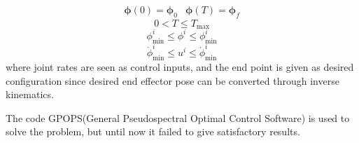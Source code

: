 \documentclass{article}
\begin{document}
	\begin{equation}
	\begin{array}{rl}
		\bm{\phi}(0) = \bm{\phi}_0 & \bm{\phi}(T) = \bm{\phi}_f
	\end{array}	
	\end{equation}
	\begin{equation}
		0 < T \le T_{\mathrm{max}}
	\end{equation}
	\begin{equation}
		\phi^i_{\mathrm{min}} \le \phi^i \le \phi^i_{\mathrm{min}}
	\end{equation}
	\begin{equation}
		\dot{\phi}^i_{\mathrm{min}} \le {u}^i \le \dot{\phi}^i_{\mathrm{min}}
	\end{equation}
where joint rates are seen as control inputs, and the end point is given as desired configuration since desired end effector pose can be converted through inverse kinematics.

The code GPOPS(General Pseudospectral Optimal Control Software) is used to solve the problem, but until now it failed to give satisfactory results.
\end{document}
